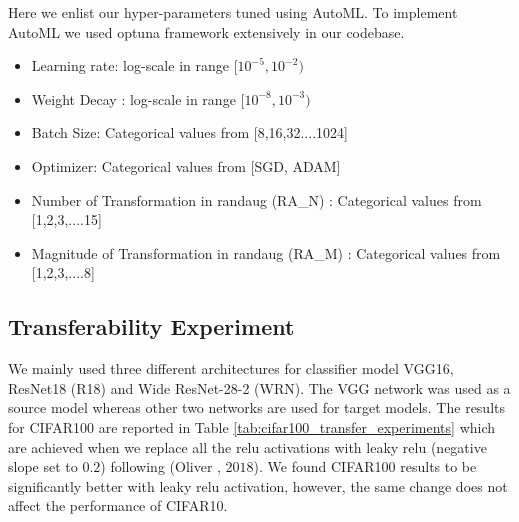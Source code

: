 \documentclass[10pt,twocolumn,letterpaper]{article}
\begin{document}
Here we enlist our hyper-parameters tuned using AutoML. To implement AutoML we used optuna framework extensively in our codebase.
\begin{itemize}
    \item Learning rate: log-scale in range $[10^{-5}, 10^{-2})$
    \item Weight Decay : log-scale in range $[10^{-8}, 10^{-3})$
    \item Batch Size: Categorical values from [8,16,32....1024]
    \item Optimizer: Categorical values from [SGD, ADAM]
    \item Number of Transformation in randaug (RA\_N) : Categorical values from [1,2,3,....15]
    \item Magnitude of Transformation in randaug (RA\_M) : Categorical values from [1,2,3,....8]
\end{itemize}



\subsection{Transferability Experiment}
We mainly used three different architectures for classifier model \ie VGG16, ResNet18 (R18) and Wide ResNet-28-2 (WRN)\footnotemark{\value{0}}. 
The VGG network was used as a source model whereas other two networks are used for target models. The results for CIFAR100 are reported in Table \ref{tab:cifar100_transfer_experiments} which are achieved when we replace all the relu activations with leaky relu (negative slope set to $0.2$) following (Oliver \etal, $2018$). We found CIFAR100 results to be significantly better with leaky relu activation, however, the same change does not affect the performance of CIFAR10.
\end{document}
